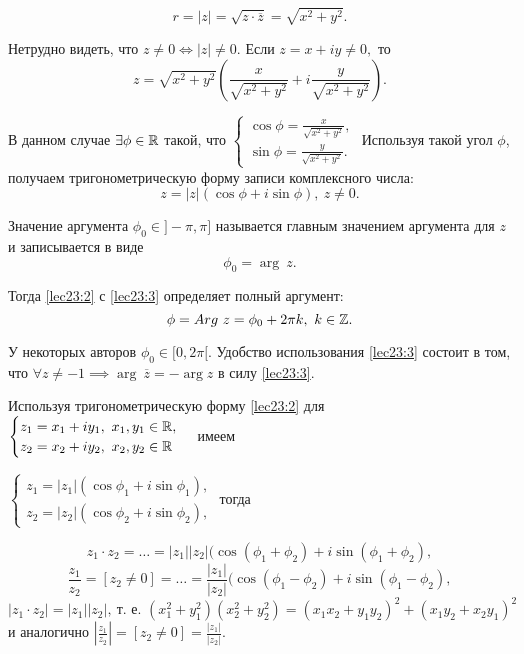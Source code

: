 \documentclass[../../main.tex]{subfiles}
\begin{document}
	\[r = |z| = \sqrt{z\cdot \overline{z}} = \sqrt{x^2+y^2}.\]
	
	Нетрудно видеть, что $z \neq 0 \iff |z| \neq 0.$ Если
	 $z = x+iy \neq 0,$ то \[z = \sqrt{x^2+y^2}\left(\frac{x}{\sqrt{x^2+y^2}}
	 + i\frac{y}{\sqrt{x^2+y^2}}\right). \] 
	
	В данном случае $\exists \phi\in\mathbb{R}$ такой, что 
	$\begin{cases} 
	\cos \phi = \frac{x}{\sqrt{x^2+y^2}},\\
	\sin \phi = \frac{y}{\sqrt{x^2+y^2}}.
	\end{cases}$ Используя такой угол $\phi$, получаем
	тригонометрическую форму записи комплексного числа:
	\begin{equation}\label{lec23:2}
	z = |z|(\cos \phi + i \sin\phi),\ z\neq 0.
	\end{equation} 
	
	Значение аргумента ${\phi}_0 \in ]-\pi, \pi]$ называется главным
	значением аргумента для $z$ и записывается в виде
	\begin{equation}
	\label{lec23:3}
	{\phi}_0 = \arg\ z.
	\end{equation}
	
	Тогда \eqref{lec23:2} с \eqref{lec23:3} определяет полный аргумент:
	\[ \phi = Arg\ z = {\phi}_0+2\pi k,\ k\in\mathbb{Z}. \]
	
	У некоторых авторов ${\phi}_0\in[0, 2\pi[.$ Удобство использования
	\eqref{lec23:3} состоит в том, что $\forall z \neq -1 \implies \arg\
	\overline{z} = - \arg z$ в силу  \eqref{lec23:3}.
	
	Используя тригонометрическую форму  \eqref{lec23:2} для  
	$\begin{cases} 
	z_1 =  x_1+iy_1,\ x_1, y_1\in \mathbb{R},\\
	z_2 =  x_2+iy_2,\ x_2, y_2\in \mathbb{R}
	\end{cases}$ имеем 
	
	$\begin{cases} 
	z_1 = |z_1|(\cos {\phi}_1 + i\sin {\phi}_1),\\
	z_2 =  |z_2|(\cos {\phi}_2 + i\sin {\phi}_2),
	\end{cases}$ тогда
	
	\[z_1\cdot z_2 = \ldots = |z_1| |z_2|(\cos({\phi}_1+{\phi}_2)+
	i\sin({\phi}_1+{\phi}_2),\]
	\[\frac{z_1}{z_2} =[z_2 \neq 0] = \ldots =\frac{ |z_1|}{ |z_2|}
	(\cos({\phi}_1-{\phi}_2)+i\sin({\phi}_1-{\phi}_2),\]
	\[ |z_1\cdot z_2| = |z_1||z_2|,\ \text{т.~е. } (x_1^2+y_1^2)(x_2^2+y_2^2)
	 = (x_1x_2 + y_1y_2)^2 + (x_1y_2+x_2y_1)^2 \]
	и аналогично $|\frac{z_1}{z_2}| = [z_2 \neq 0] = \frac{|z_1|}{|z_2|}.$
	
\end{document}
